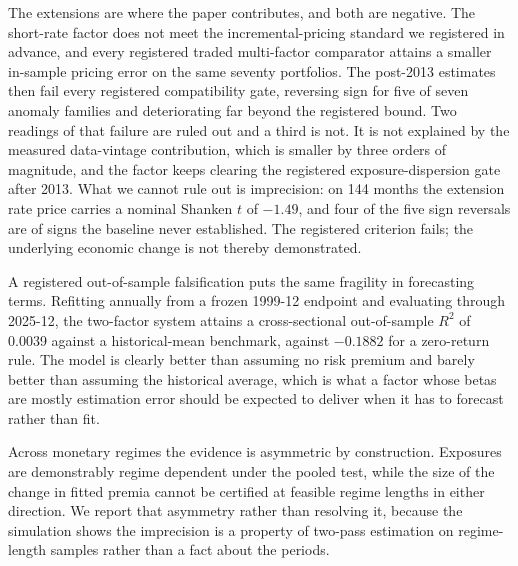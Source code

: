 \documentclass[11pt]{article}
\begin{document}
The extensions are where the paper contributes, and both are negative. The
short-rate factor does not meet the incremental-pricing standard we registered in
advance, and every registered traded multi-factor comparator attains a smaller
in-sample pricing error on the same seventy portfolios. The post-2013 estimates %
then fail every registered compatibility gate, reversing sign for five of seven %
anomaly families and deteriorating far beyond the registered bound. Two readings
of that failure are ruled out and a third is not. It is not explained by the
measured data-vintage contribution, which is smaller by three orders of
magnitude, and the factor keeps clearing the registered exposure-dispersion gate %
after 2013. What we cannot rule out is imprecision: on 144 months the extension %
rate price carries a nominal Shanken $t$ of $-1.49$, and four of the five sign reversals %
are of signs the baseline never established. The registered criterion fails; the
underlying economic change is not thereby demonstrated.

A registered out-of-sample falsification puts the same fragility in forecasting
terms. Refitting annually from a frozen 1999-12 endpoint and evaluating through %
2025-12, the two-factor system attains a cross-sectional out-of-sample $R^2$ of %
0.0039 against a historical-mean benchmark, against $-0.1882$ for a zero-return %
rule. The model is clearly better than assuming no risk premium and barely better
than assuming the historical average, which is what a factor whose betas are
mostly estimation error should be expected to deliver when it has to forecast
rather than fit.

Across monetary regimes the evidence is asymmetric by construction. Exposures are
demonstrably regime dependent under the pooled test, while the size of the change
in fitted premia cannot be certified at feasible regime lengths in either
direction. We report that asymmetry rather than resolving it, because the
simulation shows the imprecision is a property of two-pass estimation on
regime-length samples rather than a fact about the periods.
\end{document}
